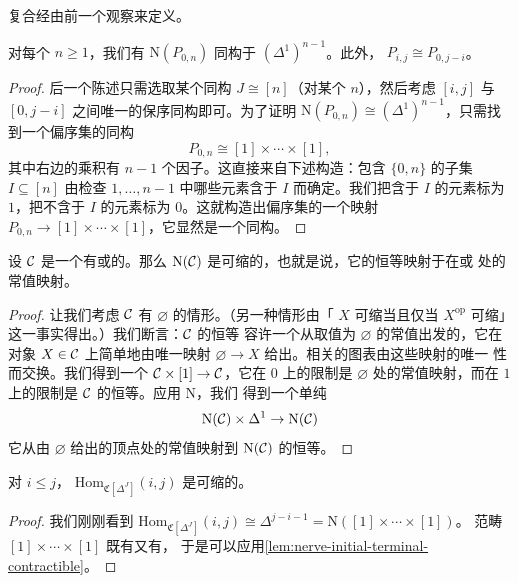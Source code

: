 复合经由前一个观察来定义。

\begin{lemma}\label{lem:nerve-p-0-n}
对每个 $n \ge 1$，我们有 $\mathrm{N}(P_{0,n})$ 同构于 $(\Delta^1)^{n-1}$。此外，
$P_{i,j} \cong P_{0,j-i}$。
\end{lemma}

\begin{proof}
后一个陈述只需选取某个同构 $J \cong [n]$（对某个 $n$），然后考虑 $[i, j]$ 与
$[0, j-i]$ 之间唯一的保序同构即可。为了证明
$\mathrm{N}(P_{0,n}) \cong (\Delta^1)^{n-1}$，只需找到一个偏序集的同构
\[
P_{0,n} \cong [1] \times \dotsb \times [1],
\]
其中右边的乘积有 $n-1$ 个因子。这直接来自下述构造：包含 $\{0, n\}$ 的子集
$I \subseteq [n]$ 由检查 $1, \dots, n-1$ 中哪些元素含于 $I$ 而确定。我们把含于 $I$
的元素标为 $1$，把不含于 $I$ 的元素标为 $0$。这就构造出偏序集的一个映射
$P_{0,n} \to [1] \times \dotsb \times [1]$，它显然是一个同构。
\end{proof}

\begin{lemma}\label{lem:nerve-initial-terminal-contractible}
设 $\mathcal{C}$ 是一个有\trInitialObject{}或\trTerminalObject{}的\trCategory{}。那么
$\mathrm{N}(\mathcal{C})$ 是可缩的，也就是说，它的恒等映射\trHomotopy{}于在\trInitialObject{}或%
\trTerminalObject{}处的常值映射。
\end{lemma}

\begin{proof}
让我们考虑 $\mathcal{C}$ 有\trInitialObject{} $\varnothing$ 的情形。（另一种情形由「\trSimplicialSet{}%
$X$ 可缩当且仅当 $X^{\mathrm{op}}$ 可缩」这一事实得出。）我们断言：$\mathcal{C}$ 的恒等\trFunctor{}%
容许一个从取值为 $\varnothing$ 的常值\trFunctor{}出发的\trNaturalTransformation{}，它在对象
$X \in \mathcal{C}$ 上简单地由唯一映射 $\varnothing \to X$ 给出。相关的图表由这些映射的唯一
性而交换。我们得到一个\trFunctor{} $\mathcal{C} \times [1] \to \mathcal{C}$，它在 $0$ 上的限制是 $\varnothing$
处的常值映射，而在 $1$ 上的限制是 $\mathcal{C}$ 的恒等。应用\trNerve{}\trFunctor{} $\mathrm{N}$，我们
得到一个单纯\trHomotopy{}%
\[
\mathrm{N}(\mathcal{C}) \times \Delta^1 \to \mathrm{N}(\mathcal{C})
\]
它从由 $\varnothing$ 给出的顶点处的常值映射到 $\mathrm{N}(\mathcal{C})$ 的恒等。
\end{proof}

\begin{corollary}\label{cor:hom-c-delta-j-contractible}
对 $i \le j$，\trSimplicialSet{} $\mathrm{Hom}_{\mathfrak{C}[\Delta^J]}(i, j)$ 是可缩的。
\end{corollary}

\begin{proof}
我们刚刚看到
$\mathrm{Hom}_{\mathfrak{C}[\Delta^J]}(i, j) \cong \Delta^{j-i-1} = \mathrm{N}([1] \times \dotsb \times [1])$。
范畴 $[1] \times \dotsb \times [1]$ 既有\trInitialObject{}又有\trTerminalObject{}，
于是可以应用\cref{lem:nerve-initial-terminal-contractible}。
\end{proof}

